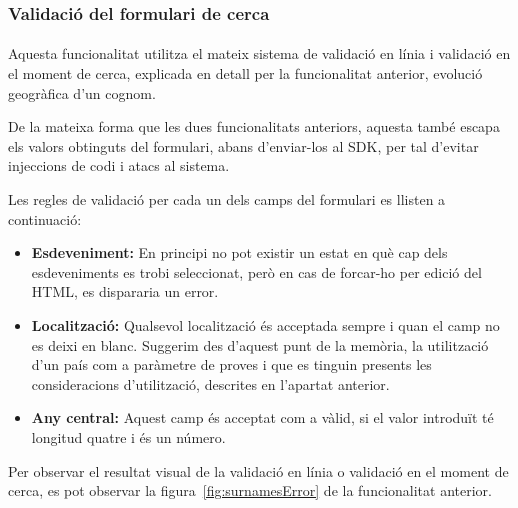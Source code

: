 \subsubsection{Validació del formulari de cerca}

\paragraph{}
Aquesta funcionalitat utilitza el mateix sistema de validació en línia i validació en el moment de cerca, explicada en detall per la funcionalitat anterior, evolució geogràfica d’un cognom.

De la mateixa forma que les dues funcionalitats anteriors, aquesta també escapa els valors obtinguts del formulari, abans d’enviar-los al SDK, per tal d'evitar injeccions de codi i atacs al sistema.

Les regles de validació per cada un dels camps del formulari es llisten a con\-ti\-nua\-ció:

\begin{itemize}
    \item \textbf{Esdeveniment:} En principi no pot existir un estat en què cap dels esdeveniments es trobi seleccionat, però en cas de forcar-ho per edició del HTML, es dispararia un error.
    \item \textbf{Localització:} Qualsevol localització és acceptada sempre i quan el camp no es deixi en blanc. Suggerim des d'aquest punt de la memòria, la utilització d’un país com a paràmetre de proves i que es tinguin presents les consideracions d'utilització, descrites en l’apartat anterior.
    \item \textbf{Any central:} Aquest camp és acceptat com a vàlid, si el valor introduït té longitud quatre i és un número.
\end{itemize}

Per observar el resultat visual de la validació en línia o validació en el moment de cerca, es pot observar la figura~\ref{fig:surnamesError} de la funcionalitat anterior.
